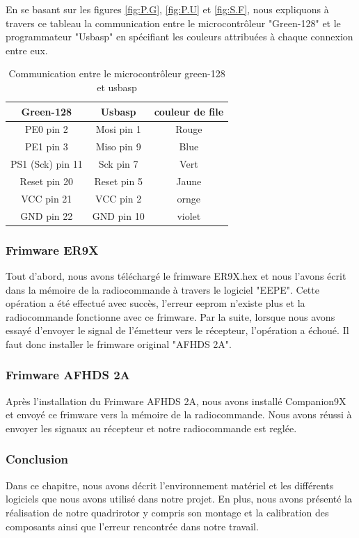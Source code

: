 	
	En se basant sur les figures \ref{fig:P.G}, \ref{fig:P.U} et \ref{fig:S.F}, nous expliquons à travers ce tableau la communication entre le microcontrôleur "Green-128" et le programmateur "Usbasp" en spécifiant les couleurs attribuées à chaque connexion entre eux.
	
	\begin{table}[H]
		\begin{center}
			\caption{Communication entre le microcontrôleur green-128 et usbasp }
			\begin{tabular}{|c|c|c|}
				\hline
				\centering
				Green-128 &	Usbasp & couleur de file \\
				\hline
				PE0 pin 2 & Mosi pin 1 & Rouge  \\
				\hline
				PE1 pin 3 & Miso pin 9 & Blue  \\
				\hline
				PS1 (Sck)  pin 11 & Sck pin 7 & Vert  \\
				\hline
				Reset pin 20 & Reset pin 5 & Jaune \\
				\hline
				VCC pin 21 & VCC pin 2 &  ornge \\
				\hline
				GND pin 22 & GND pin 10 & violet \\
				\hline
			\end{tabular}
		\end{center}
	\end{table}
	\subsubsection{Frimware ER9X}
	Tout d'abord, nous avons téléchargé le frimware ER9X.hex et nous l'avons écrit dans la mémoire de la radiocommande à travers le logiciel "EEPE". Cette opération a été effectué avec succès, l'erreur eeprom n'existe plus et la radiocommande fonctionne avec ce frimware. Par la suite, lorsque nous avons essayé d'envoyer le signal de l'émetteur vers le récepteur, l'opération a échoué. Il faut donc installer le frimware original "AFHDS 2A".
	\subsubsection{Frimware AFHDS 2A}
	Après l'installation du Frimware AFHDS 2A, nous avons installé Companion9X et envoyé ce frimware vers la mémoire de la radiocommande. Nous avons réussi à envoyer les signaux au récepteur et notre radiocommande est reglée.
	\subsubsection{Conclusion}
	Dans ce chapitre, nous avons décrit l'environnement matériel et les différents logiciels que nous avons utilisé dans notre projet. En plus, nous avons présenté la réalisation de notre quadrirotor y compris son montage et la calibration des composants ainsi que l'erreur rencontrée dans notre travail.


